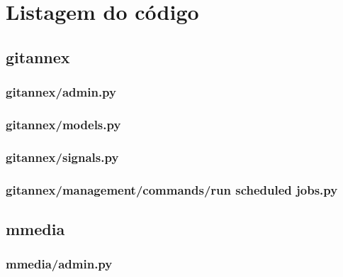 \chapter{Listagem do código}
\label{ApendiceA}

\section{gitannex}



\subsection{gitannex/admin.py}


\subsection{gitannex/models.py}


\subsection{gitannex/signals.py}


\subsection{gitannex/management/commands/run scheduled jobs.py}



\section{mmedia}



\subsection{mmedia/admin.py}


